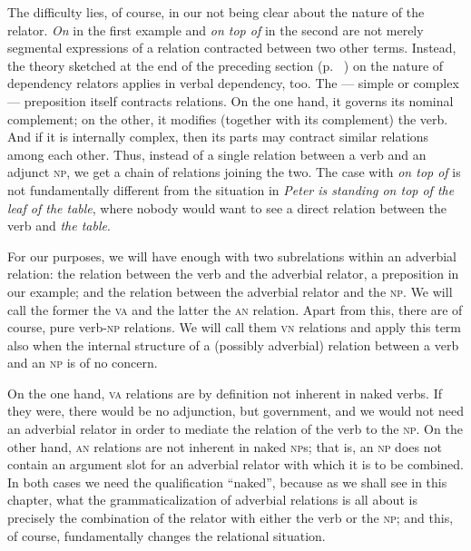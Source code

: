 The difficulty lies, of course, in our not being clear about the nature of the relator. \textit{On} in the first example and \textit{on top of} in the second are not merely segmental expressions of a relation contracted between two other terms. Instead, the theory sketched at the end of the preceding section (p.~\pageref{page78}\chk%
) on the nature of dependency relators applies in verbal dependency, too. The — simple or complex — preposition itself contracts relations. On the one hand, it governs its nominal complement; on the other, it modifies (together with its complement) the verb. And if it is internally complex, then its parts may contract similar relations among each other. Thus, instead of a single relation between a verb and an adjunct \textsc{np}, we get a chain of relations joining the two. The case with \textit{on top of} is not fundamentally different from the situation in \textit{Peter is standing on top of the leaf of the table}, where nobody would want to see a direct relation between the verb and \textit{the table}.

For our purposes, we will have enough with two subrelations within an adverbial relation: the relation between the verb and the adverbial relator, a preposition in our example; and the relation between the adverbial relator and the \textsc{np}. We will call the former the \textsc{va} and the latter the \textsc{an} relation. Apart from this, there are of course, pure verb-\textsc{np} relations. We will call them \textsc{vn} relations and apply this term also when the internal structure of a (possibly adverbial) relation between a verb and an \textsc{np} is of no concern.

On the one hand, \textsc{va} relations are by definition not inherent in naked verbs. If they were, there would be no adjunction, but government, and we would not need an adverbial relator in order to mediate the relation of the verb to the \textsc{np}. On the other hand, \textsc{an} relations are not inherent in naked \textsc{np}s; that is, an \textsc{np} does not contain an argument slot for an adverbial relator with which it is to be combined. In both cases we need the qualification ``naked'', because as we shall see in this chapter, what the grammaticalization of adverbial relations is all about is precisely the combination of the relator with either the verb or the \textsc{np}; and this, of course, fundamentally changes the relational situation.

